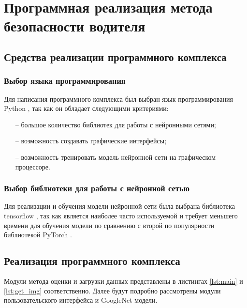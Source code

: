 \section{Программная реализация метода безопасности водителя}
\subsection{Средства реализации программного комплекса}
\subsubsection{Выбор языка программирования}
Для написания программного комплекса  был выбран язык программирования Python \cite{python}, так как он обладает следующими критериями:
\begin{itemize}[leftmargin=1.6\parindent]
	\item[--] большое количество библиотек для работы с нейронными сетями;
	\item[--] возможность создавать графические интерфейсы;
	\item[--] возможность тренировать модель нейронной сети на графическом процессоре.
\end{itemize}

\subsubsection{Выбор библиотеки для работы с нейронной сетью}
Для реализации и обучения модели нейронной сети была выбрана библиотека tensorflow \cite{tensorflow}, так как является наиболее часто используемой и требует меньшего времени для обучения модели по сравнению с второй по популярности библиотекой PyTorch \cite{tensorflow_pytorch}.

\subsection{Реализация программного комплекса}
Модули метода оценки и загрузки данных представлены в листингах \ref{lst:main} и \ref{lst:get_img} соответственно. Далее будут подробно рассмотрены модули пользовательского интерфейса и GoogleNet модели.

